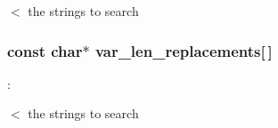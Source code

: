 $<$ the strings to search \hypertarget{group__Extern__Declarations_ga449ebc7257a18cdb95c138b530539f88}{
\subsubsection[{var\_\-len\_\-replacements}]{\setlength{\rightskip}{0pt plus 5cm}const char$\ast$ {\bf var\_\-len\_\-replacements}\mbox{[}$\,$\mbox{]}}}
\label{group__Extern__Declarations_ga449ebc7257a18cdb95c138b530539f88}
:

$<$ the strings to search 